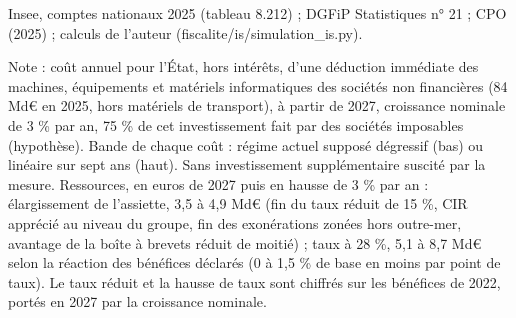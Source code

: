 Insee, comptes nationaux 2025 (tableau 8.212) ; DGFiP Statistiques n° 21 ; CPO (2025) ; calculs de l'auteur (fiscalite/is/simulation\_is.py).\par Note : coût annuel pour l'État, hors intérêts, d'une déduction immédiate des machines, équipements et matériels informatiques des sociétés non financières (84 Md\euro{} en 2025, hors matériels de transport), à partir de 2027, croissance nominale de 3 \% par an, 75 \% de cet investissement fait par des sociétés imposables (hypothèse). Bande de chaque coût : régime actuel supposé dégressif (bas) ou linéaire sur sept ans (haut). Sans investissement supplémentaire suscité par la mesure. Ressources, en euros de 2027 puis en hausse de 3 \% par an : élargissement de l'assiette, 3,5 à 4,9 Md\euro{} (fin du taux réduit de 15 \%, CIR apprécié au niveau du groupe, fin des exonérations zonées hors outre-mer, avantage de la boîte à brevets réduit de moitié) ; taux à 28 \%, 5,1 à 8,7 Md\euro{} selon la réaction des bénéfices déclarés (0 à 1,5 \% de base en moins par point de taux). Le taux réduit et la hausse de taux sont chiffrés sur les bénéfices de 2022, portés en 2027 par la croissance nominale.
